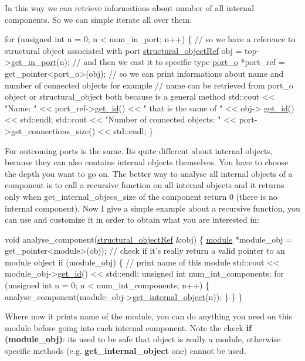  In this way we can retrieve informations about number of all internal components. So we can simple iterate all over them\+: 
\begin{DoxyCode}
\textcolor{keywordflow}{for} (\textcolor{keywordtype}{unsigned} \textcolor{keywordtype}{int} n = 0; n < num\_in\_port; n++)
\{
   \textcolor{comment}{// so we have a reference to structural object associated with port}
   \hyperlink{structrefcount}{structural\_objectRef} obj = top->\hyperlink{classmodule_a0e39b683ccf93e8a47bb227430ed3233}{get\_in\_port}(n);
   \textcolor{comment}{// and then we cast it to specific type}
   \hyperlink{structport__o}{port\_o} *port\_ref = get\_pointer<port\_o>(obj);
   \textcolor{comment}{// so we can print informations about name and number of connected objects for example}
   \textcolor{comment}{// name can be retrieved from port\_o object or structural\_object both because is a general method}
   std::cout << \textcolor{stringliteral}{"Name: "} << port\_ref->\hyperlink{classstructural__object_a53e1999ebc946f37a981507d4ef72650}{get\_id}() << \textcolor{stringliteral}{" that is the same of "} << obj->
      \hyperlink{classstructural__object_a53e1999ebc946f37a981507d4ef72650}{get\_id}() << std::endl;
   std::cout << \textcolor{stringliteral}{"Number of connected objects: "} << port->get\_connections\_size() << std::endl;
\}
\end{DoxyCode}
 For outcoming ports is the same. It\textquotesingle{}s quite different about internal objects, because they can also contains internal objects themselves. You have to choose the depth you want to go on. The better way to analyse all internal objects of a component is to call a recursive function on all internal objects and it returns only when get\+\_\+internal\+\_\+objecs\+\_\+size of the component return 0 (there is no internal component). Now I give a simple example about a recursive function, you can use and customize it in order to obtain what you are interested in\+: 
\begin{DoxyCode}
\textcolor{keywordtype}{void} analyse\_component(\hyperlink{structrefcount}{structural\_objectRef} &obj)
\{
   \hyperlink{classmodule}{module} *module\_obj = get\_pointer<module>(obj);
   \textcolor{comment}{// check if it's really return a valid pointer to an module object}
   \textcolor{keywordflow}{if} (module\_obj)
   \{
     \textcolor{comment}{// print name of this module}
     std::cout << module\_obj->\hyperlink{classstructural__object_a53e1999ebc946f37a981507d4ef72650}{get\_id}() << std::endl;
     \textcolor{keywordtype}{unsigned} \textcolor{keywordtype}{int} num\_int\_components;
     \textcolor{keywordflow}{for} (\textcolor{keywordtype}{unsigned} \textcolor{keywordtype}{int} n = 0; n < num\_int\_components; n++)
     \{
        analyse\_component(module\_obj->\hyperlink{classmodule_af59435e147c07a183bf7c8ab525eb3fd}{get\_internal\_object}(n));
     \}
   \}
\}
\end{DoxyCode}
 Where now it prints name of the module, you can do anything you need on this module before going into each internal component. Note the check {\bfseries if (module\+\_\+obj)}\+: it\textquotesingle{}s used to be safe that object is really a module, otherwise specific methods (e.\+g. {\bfseries get\+\_\+internal\+\_\+object} one) cannot be used. 